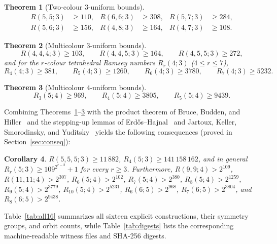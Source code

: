 \documentclass[11pt]{article}
\newtheorem{theorem}{Theorem}
\newtheorem{corollary}[theorem]{Corollary}
\theoremstyle{remark}
\begin{document}
\begin{theorem}[Two-colour $3$-uniform bounds]\label{thm:2col3u}
\begin{align*}
  R(5,5;3)&\ge 110, & R(6,6;3)&\ge 308, & R(5,7;3)&\ge 284,\\
  R(5,6;3)&\ge 156, & R(4,8;3)&\ge 164, & R(4,7;3)&\ge 108.
\end{align*}
\end{theorem}

\begin{theorem}[Multicolour $3$-uniform bounds]\label{thm:mcol3u}
\[
  R(4,4,4;3)\ge 103,\qquad R(4,4,5;3)\ge 164,\qquad R(4,5,5;3)\ge 272,
\]
and for the $r$-colour tetrahedral Ramsey numbers $R_r(4;3)$ ($4\le r\le 7$),
\[
  R_4(4;3)\ge 381,\qquad R_5(4;3)\ge 1260,\qquad R_6(4;3)\ge 3780,\qquad
  R_7(4;3)\ge 5232.
\]
\end{theorem}

\begin{theorem}[Multicolour $4$-uniform bounds]\label{thm:mcol4u}
\[
  R_3(5;4)\ge 969,\qquad R_4(5;4)\ge 3805,\qquad R_5(5;4)\ge 9439.
\]
\end{theorem}

Combining Theorems~\ref{thm:2col3u}--\ref{thm:mcol4u} with the product theorem
of Bruce, Budden, and Hiller~\cite{brbh} and the stepping-up lemmas of
Erd\H{o}s--Hajnal~\cite{grs} and Jartoux, Keller, Smorodinsky, and
Yuditsky~\cite{jaksy} yields the following consequences (proved in
Section~\ref{sec:conseq}):

\begin{corollary}\label{cor:conseq}
$R(5,5,5;3)\ge 11\,882$, $R_4(5;3)\ge 141\,158\,162$, and in general
$R_r(5;3)\ge 109^{2^{r-2}}+1$ for every $r\ge 3$. Furthermore,
$R(9,9;4)>2^{109}$, $R(11,11;4)>2^{307}$, $R_6(5;4)>2^{102}$,
$R_7(5;4)>2^{380}$, $R_8(5;4)>2^{1259}$, $R_9(5;4)>2^{3779}$,
$R_{10}(5;4)>2^{5231}$, $R_6(6;5)>2^{968}$, $R_7(6;5)>2^{3804}$, and
$R_8(6;5)>2^{9438}$.
\end{corollary}

Table~\ref{tab:all16} summarizes all sixteen explicit constructions, their
symmetry groups, and orbit counts, while Table~\ref{tab:digests} lists the
corresponding machine-readable witness files and SHA-256 digests.
\end{document}
